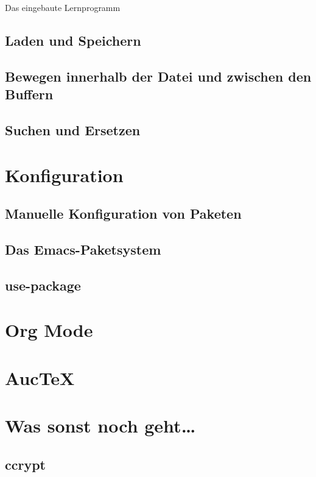 \documentclass[12pt,ngerman]{scrbook}
\begin{document}
Das eingebaute Lernprogramm

\section{Laden und Speichern}

\section{Bewegen innerhalb der Datei und zwischen den Buffern}

\section{Suchen und Ersetzen}

\chapter{Konfiguration}

\section{Manuelle Konfiguration von Paketen}

\section{Das Emacs-Paketsystem}

\section{use-package}

\chapter{Org Mode}

\chapter{Auc\TeX}

\chapter{Was sonst noch geht\ldots}

\section{ccrypt}
\end{document}
